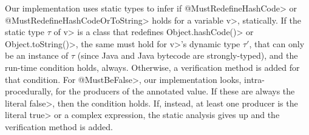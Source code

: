Our implementation uses static types to infer if
\<@MustRedefineHashCode> or \<@MustRedefineHashCodeOrToString> holds for a variable \<v>,
statically. If the static type
$\tau$ of \<v> is a class that redefines \<Object.hashCode()> or \<Object.toString()>,
the same must hold for \<v>'s dynamic type $\tau'$, that can only be an
instance of $\tau$ (since Java and Java bytecode are strongly-typed),
and the run-time condition holds, always.
Otherwise, a verification method is added for that condition.
For \<@MustBeFalse>, our implementation looks, intra-procedurally, for
the producers of the annotated value.
If these are always the literal \<false>, then the condition holds.
If, instead, at least one producer is the literal \<true> or a complex expression,
the static analysis gives up and the verification method is added.
